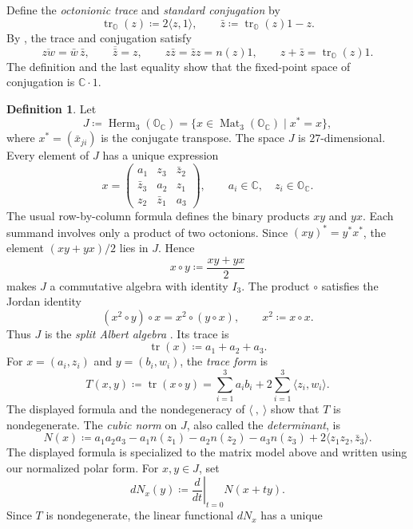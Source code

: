 \documentclass[12pt]{article}
\theoremstyle{definition}
\newtheorem{definition}[theorem]{Definition}
\DeclareMathOperator{\Herm}{Herm}
\begin{document}
Define the \emph{octonionic trace} and \emph{standard conjugation} by
\[
    \operatorname{tr}_{\mathbb O}(z)
    \coloneqq2\langle z,1\rangle,
    \qquad
    \bar z\coloneqq\operatorname{tr}_{\mathbb O}(z)1-z.
\]
By \cite[Lemma~1.3.1]{SV}, the trace and conjugation satisfy
\[
    \overline{zw}=\bar w\,\bar z,
    \qquad
    \overline{\bar z}=z,
    \qquad
    z\bar z=\bar z z=n(z)1,
    \qquad
    z+\bar z=\operatorname{tr}_{\mathbb O}(z)1.
\]
The definition and the last equality show that the fixed-point space of
conjugation is \(\mathbb C\cdot1\).

\begin{definition}
Let
\[
    J\coloneqq\Herm_3(\mathbb O_{\mathbb C})
    =\{x\in\operatorname{Mat}_3(\mathbb O_{\mathbb C})\mid x^*=x\},
\]
where \(x^*=(\bar x_{ji})\) is the conjugate transpose. The space \(J\) is
\(27\)-dimensional. Every element of \(J\) has a unique expression
\[
    x=
    \begin{pmatrix}
        a_1&z_3&\bar z_2\\
        \bar z_3&a_2&z_1\\
        z_2&\bar z_1&a_3
    \end{pmatrix},
    \qquad
    a_i\in\mathbb C,\quad z_i\in\mathbb O_{\mathbb C}.
\]
The usual row-by-column formula defines the binary products \(xy\) and
\(yx\). Each summand involves only a product of two octonions. Since
\((xy)^*=y^*x^*\), the element \((xy+yx)/2\) lies in \(J\). Hence
\[
    x\circ y\coloneqq\frac{xy+yx}{2}
\]
makes \(J\) a commutative algebra with identity \(I_3\). The product
\(\circ\) satisfies the Jordan identity
\[
    (x^2\circ y)\circ x=x^2\circ(y\circ x),
    \qquad x^2\coloneqq x\circ x.
\]
Thus \(J\) is the \emph{split Albert algebra}
\cite[Equations~(5.1)--(5.2) and Proposition~5.1.6]{SV}. Its trace is
\[
    \operatorname{tr}(x)\coloneqq a_1+a_2+a_3.
\]
For \(x=(a_i,z_i)\) and
\(y=(b_i,w_i)\), the \emph{trace form} is
\[
    T(x,y)\coloneqq\operatorname{tr}(x\circ y)
    =\sum_{i=1}^3a_ib_i
       +2\sum_{i=1}^3\langle z_i,w_i\rangle.
\]
The displayed formula and the nondegeneracy of \(\langle\ ,\ \rangle\)
show that \(T\) is nondegenerate. The \emph{cubic norm} on \(J\), also
called the \emph{determinant}, is
\[
    N(x)\coloneqq a_1a_2a_3-a_1n(z_1)-a_2n(z_2)-a_3n(z_3)
           +2\langle z_1z_2,\bar z_3\rangle.
\]
The displayed formula is \cite[Equation~(5.11)]{SV} specialized to the
matrix model above and written using our normalized polar form. For
\(x,y\in J\), set
\[
    dN_x(y)
    \coloneqq
    \left.\frac{d}{dt}\right|_{t=0}N(x+ty).
\]
Since \(T\) is nondegenerate, the linear functional \(dN_x\) has a unique

\end{definition}
\end{document}
